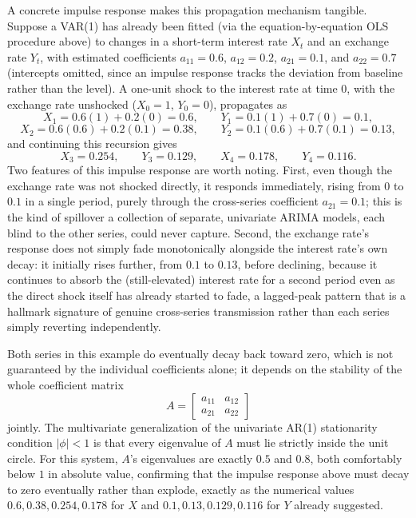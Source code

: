 \documentclass[../ai_in_finance]{subfiles}
\begin{document}
A concrete impulse response makes this propagation mechanism tangible. Suppose a VAR(1) has already been fitted (via the equation-by-equation OLS procedure above) to changes in a short-term interest rate $X_t$ and an exchange rate $Y_t$, with estimated coefficients $a_{11}=0.6$, $a_{12}=0.2$, $a_{21}=0.1$, and $a_{22}=0.7$ (intercepts omitted, since an impulse response tracks the deviation from baseline rather than the level). A one-unit shock to the interest rate at time $0$, with the exchange rate unshocked ($X_0=1$, $Y_0=0$), propagates as
\begin{equation*}
X_1 = 0.6(1) + 0.2(0) = 0.6, \qquad Y_1 = 0.1(1) + 0.7(0) = 0.1,
\end{equation*}
\begin{equation*}
X_2 = 0.6(0.6) + 0.2(0.1) = 0.38, \qquad Y_2 = 0.1(0.6) + 0.7(0.1) = 0.13,
\end{equation*}
and continuing this recursion gives
\begin{equation*}
X_3 = 0.254, \qquad Y_3 = 0.129, \qquad X_4 = 0.178, \qquad Y_4 = 0.116.
\end{equation*}
Two features of this impulse response are worth noting. First, even though the exchange rate was not shocked directly, it responds immediately, rising from $0$ to $0.1$ in a single period, purely through the cross-series coefficient $a_{21}=0.1$; this is the kind of spillover a collection of separate, univariate ARIMA models, each blind to the other series, could never capture.
Second, the exchange rate's response does not simply fade monotonically alongside the interest rate's own decay: it initially rises further, from $0.1$ to $0.13$, before declining, because it continues to absorb the (still-elevated) interest rate for a second period even as the direct shock itself has already started to fade, a lagged-peak pattern that is a hallmark signature of genuine cross-series transmission rather than each series simply reverting independently.

Both series in this example do eventually decay back toward zero, which is not guaranteed by the individual coefficients alone; it depends on the stability of the whole coefficient matrix
$$A = \begin{bmatrix} a_{11} & a_{12} \\ a_{21} & a_{22} \end{bmatrix}$$
jointly. The multivariate generalization of the univariate AR(1) stationarity condition $|\phi|<1$ is that every eigenvalue of $A$ must lie strictly inside the unit circle. For this system, $A$'s eigenvalues are exactly $0.5$ and $0.8$, both comfortably below $1$ in absolute value, confirming that the impulse response above must decay to zero eventually rather than explode, exactly as the numerical values $0.6, 0.38, 0.254, 0.178$ for $X$ and $0.1, 0.13, 0.129, 0.116$ for $Y$ already suggested.
\end{document}

